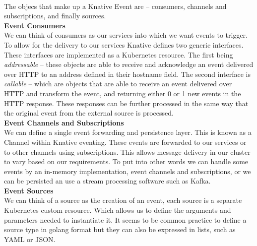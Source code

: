 \\The objecs that make up a Knative Event are -- consumers, channels and subscriptions, and finally sources.
\\\textbf{Event Consumers}
\\We can think of consumers as our services into which we want events to trigger. To allow for the delivery to our services Knative defines two generic interfaces. These interfaces are implemented as a Kubernetes resource. The first being \textit{addressable} -- these objects are able to receive and acknowledge an event delivered over HTTP to an address defined in their hostname field. The second interface is \textit{callable} -- which are objects that are able to receive an event delivered over HTTP and transform the event, and returning either 0 or 1 new events in the HTTP response. These responses can be further processed in the same way that the original event from the external source is processed.
\\\textbf{Event Channels and Subscriptions}
\\We can define a single event forwarding and persistence layer. This is known as a Channel within Knative eventing. These events are forwarded to our services or to other channels using subscriptions. This allows message delivery in our cluster to vary based on our requirements. To put into other words we can handle some events by an in-memory implementation, event channels and subscriptions, or we can be persisted an use a stream processing software such as Kafka.
\\\textbf{Event Sources}
\\We can think of a source as the creation of an event, each source is a separate Kubernetes custom resource. Which allows us to define the arguments and parameters needed to instantiate it. It seems to be common practice to define a source type in golang format but they can also be expressed in lists, such as YAML or JSON.

